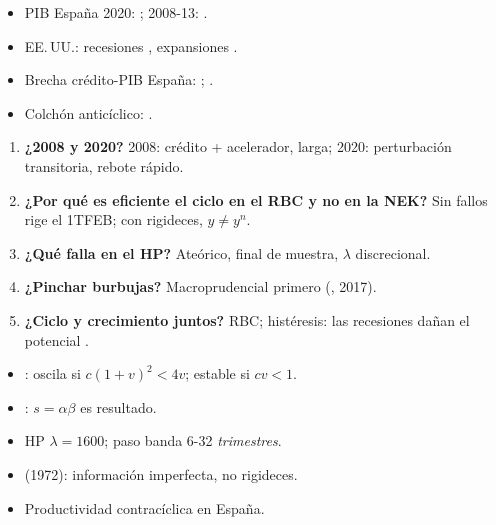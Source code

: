 \documentclass{article}
\begin{document}
\begin{columnas}
\anexorepaso
{}
\begin{itemize}
\item PIB España 2020: ; 2008-13: .
\item EE.\,UU.: recesiones , expansiones .
\item Brecha crédito-PIB España: ; .
\item Colchón anticíclico: .
\end{itemize}
\begin{enumerate}
\item \textbf{¿2008 y 2020?} 2008: crédito + acelerador, larga; 2020: perturbación transitoria, rebote rápido.
\item \textbf{¿Por qué es eficiente el ciclo en el RBC y no en la NEK?} Sin fallos rige el 1TFEB; con rigideces, $y\neq y^n$.
\item \textbf{¿Qué falla en el HP?} Ateórico, final de muestra, $\lambda$ discrecional.
\item \textbf{¿Pinchar burbujas?} Macroprudencial primero (, 2017).
\item \textbf{¿Ciclo y crecimiento juntos?} RBC; histéresis: las recesiones dañan el potencial .
\end{enumerate}
\begin{trampa}
\begin{itemize}
\item {}: oscila si $c(1+v)^2<4v$; estable si $cv<1$.
\item {}: $s=\alpha\beta$ es resultado.
\item HP $\lambda=1600$; paso banda 6-32 \emph{trimestres}.
\item {} (1972): información imperfecta, no rigideces.
\item Productividad contracíclica en España.
\end{itemize}
\end{trampa}

\end{columnas}
\end{document}
